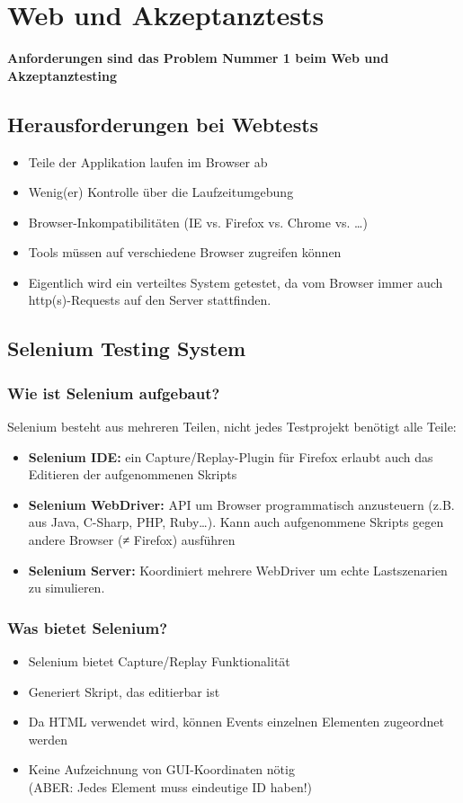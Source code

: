 \documentclass[a4paper,10pt]{article}
\newcommand{\Bold}[1]{\textbf{#1}} %
\begin{document}
\newpage
\section{Web und Akzeptanztests}
\textbf{\Bold Anforderungen sind das Problem Nummer 1 beim Web und Akzeptanztesting}\\
\subsection{Herausforderungen bei Webtests}
\begin{itemize}
\item Teile der Applikation laufen im Browser ab
\item Wenig(er) Kontrolle über die Laufzeitumgebung
\item Browser-Inkompatibilit\"aten (IE vs. Firefox vs. Chrome vs. …)
\item Tools müssen auf verschiedene Browser zugreifen k\"onnen
\item Eigentlich wird ein verteiltes System getestet, da vom Browser immer auch http(s)-Requests auf den Server stattfinden.
\end{itemize}

\subsection{Selenium Testing System}
\subsubsection{Wie ist Selenium aufgebaut?}
Selenium besteht aus mehreren Teilen, nicht jedes Testprojekt ben\"otigt alle Teile:
\begin{itemize}
\item \textbf{\Bold Selenium IDE:} ein Capture/Replay-Plugin für Firefox erlaubt auch das Editieren der aufgenommenen Skripts
\item \textbf{\Bold Selenium WebDriver:} API um Browser programmatisch anzusteuern (z.B. aus Java, C-Sharp, PHP, Ruby…). Kann auch aufgenommene Skripts gegen andere Browser (≠ Firefox) ausführen
\item \textbf{\Bold Selenium Server:} Koordiniert mehrere WebDriver um echte Lastszenarien zu simulieren.

\end{itemize}

\subsubsection{Was bietet Selenium?}
\begin{itemize}
\item Selenium bietet Capture/Replay Funktionalit\"at
\item Generiert Skript, das editierbar ist
\item Da HTML verwendet wird, k\"onnen Events einzelnen Elementen zugeordnet werden
\item Keine Aufzeichnung von GUI-Koordinaten n\"otig\\
(ABER: Jedes Element muss eindeutige ID haben!)
\end{itemize}
\end{document}
